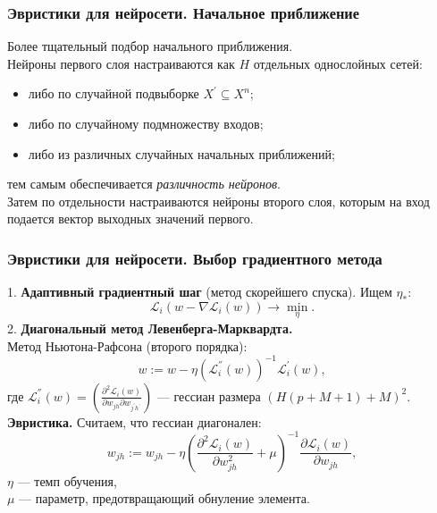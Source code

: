 \documentclass[10pt]{beamer}
\begin{document}
\begin{frame}
\frametitle{Эвристики для нейросети. Начальное приближение}
 Более тщательный подбор начального приближения.\\
 \vspace{0.7cm}
Нейроны первого слоя настраиваются как $H$ отдельных однослойных сетей:
\begin{itemize}
\item либо по случайной подвыборке $X^{'} \subseteq X^n$;
\item либо по случайному подмножеству входов;
\item либо из различных случайных начальных приближений;
\end{itemize}
тем самым обеспечивается \textit{различность нейронов}.\\
 \vspace{0.9cm}
Затем по отдельности настраиваются нейроны второго слоя, которым на вход подается вектор выходных значений первого. 
\\
 \vspace{0.9cm}
 
\end{frame} 

\begin{frame}
\frametitle{Эвристики для нейросети. Выбор градиентного метода}
 1. \textbf{Адаптивный градиентный шаг} (метод скорейшего спуска). Ищем $\eta_*$:
 \begin{equation*}
  \mathscr{L}_i(w - \nabla \mathscr{L}_i(w)) \rightarrow \min_\eta.
 \end{equation*}
 2. \textbf{Диагональный метод Левенберга-Марквардта.}\\
   \vspace{0.2cm}
 Метод Ньютона-Рафсона (второго порядка):
 \begin{equation*}
 w := w - \eta (\mathscr{L}_i^{''}(w))^{-1} \mathscr{L}_i^{'}(w),
 \end{equation*}
 где $\mathscr{L}_i^{''}(w) = \left( \frac{\partial^2 \mathscr{L}_i(w) }{\partial w_{jh} \partial w_{j^{'}h^{'}}}   \right)$ --- гессиан размера $(H(p+M+1) + M)^2$.\\
  \vspace{0.4cm}
 \textbf{Эвристика.} Считаем, что гессиан диагонален:
 \begin{equation*}
 w_{jh} := w_{jh} - \eta \left(  \frac{\partial^2 \mathscr{L}_i(w) }{\partial w_{jh}^2} + \mu  \right) ^{-1} \frac{\partial \mathscr{L}_i(w) }{\partial w_{jh}}, 
\end{equation*}  
$\eta$ --- темп обучения, \\
$\mu$ --- параметр, предотвращающий обнуление элемента.
\end{frame} 
\end{document}
